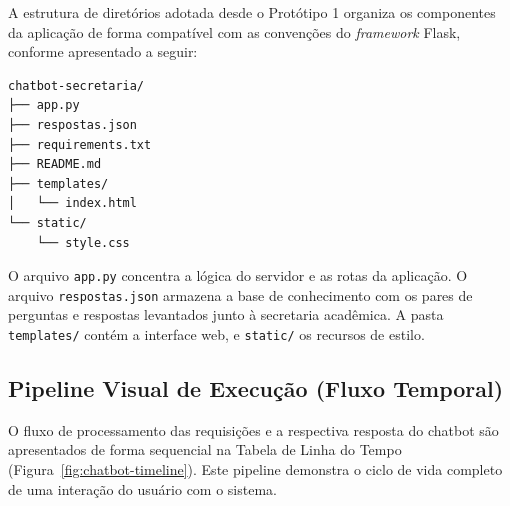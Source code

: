 A estrutura de diretórios adotada desde o Protótipo 1 organiza os componentes da aplicação de forma compatível com as convenções do \textit{framework} Flask, conforme apresentado a seguir:

\begin{verbatim}
chatbot-secretaria/
├── app.py
├── respostas.json
├── requirements.txt
├── README.md
├── templates/
│   └── index.html
└── static/
    └── style.css
\end{verbatim}

O arquivo \texttt{app.py} concentra a lógica do servidor e as rotas da aplicação. O arquivo \texttt{respostas.json} armazena a base de conhecimento com os pares de perguntas e respostas levantados junto à secretaria acadêmica. A pasta \texttt{templates/} contém a interface web, e \texttt{static/} os recursos de estilo.

\subsection{Pipeline Visual de Execução (Fluxo Temporal)}

O fluxo de processamento das requisições e a respectiva resposta do chatbot são apresentados de forma sequencial na Tabela de Linha do Tempo (Figura~\ref{fig:chatbot-timeline}). Este pipeline demonstra o ciclo de vida completo de uma interação do usuário com o sistema.


